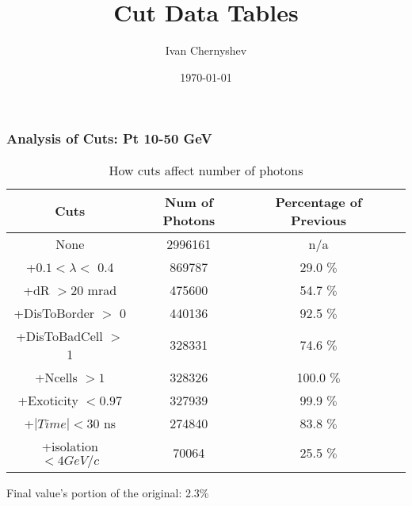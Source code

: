 \documentclass{beamer}
\title{Cut Data Tables}
\author{Ivan Chernyshev}
\date{\today}
\begin{document}
 

\frame 
{ 
\frametitle{Analysis of Cuts: Pt 10-50 GeV} 
\begin{table} 
\caption{How cuts affect number of photons} 
\centering 
\begin{tabular}{c c c c} 
\hline\hline 
Cuts & Num of Photons & Percentage of Previous\\ [0.5ex] 
\hline
None & 2996161 & n/a\\
+$0.1 < \lambda <$ 0.4 & 869787 & 29.0 $\%$ \\
+dR $> 20$ mrad & 475600 & 54.7 $\%$ \\
+DisToBorder $>$ 0 & 440136 & 92.5 $\%$ \\
+DisToBadCell $>$ 1 & 328331 & 74.6 $\%$ \\
+Ncells $> 1$ & 328326 & 100.0 $\%$ \\
+Exoticity $< 0.97$ & 327939 & 99.9 $\%$ \\
+$|Time| < 30$ ns & 274840 & 83.8 $\%$ \\
+isolation $< 4 GeV/c$ & 70064 & 25.5 $\%$ \\
[1ex] 
\hline 
\end{tabular} 
\label{table:nonlin} 
\end{table} 
 Final value's portion of the original: 2.3\%
 } 
\end{document}
